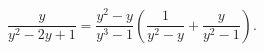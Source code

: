 \begin{ex}[type=equation]
	\begin{condition}
		$\dfrac{y}{y^2 - 2y + 1} = \dfrac{y^2 - y}{y^3 - 1}\left(\dfrac{1}{y^2 - y} + \dfrac{y}{y^2 - 1}\right).$
	\end{condition}
\end{ex}